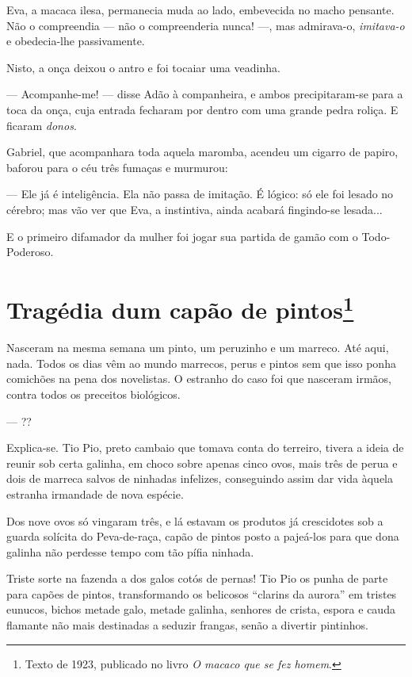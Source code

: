 Eva, a macaca ilesa, permanecia muda ao lado, embevecida no macho
pensante. Não o compreendia --- não o compreenderia nunca! ---, mas
admirava-o, \emph{imitava-o} e obedecia-lhe passivamente.

Nisto, a onça deixou o antro e foi tocaiar uma veadinha.

--- Acompanhe-me! --- disse Adão à companheira, e ambos precipitaram-se
para a toca da onça, cuja entrada fecharam por dentro com uma grande
pedra roliça. E ficaram \emph{donos}.

Gabriel, que acompanhara toda aquela maromba, acendeu um cigarro de
papiro, baforou para o céu três fumaças e murmurou:

--- Ele já é inteligência. Ela não passa de imitação. É lógico: só ele
foi lesado no cérebro; mas vão ver que Eva, a instintiva, ainda acabará
fingindo-se lesada...

E o primeiro difamador da mulher foi jogar sua partida de gamão com o
Todo-Poderoso.

\chapter{Tragédia dum capão de pintos\footnote[*]{Texto de 1923, publicado no livro \emph{O macaco que se fez homem}.}}

Nasceram na mesma semana um pinto, um peruzinho e um marreco. Até aqui,
nada. Todos os dias vêm ao mundo marrecos, perus e pintos sem que isso
ponha comichões na pena dos novelistas. O estranho do caso foi que
nasceram irmãos, contra todos os preceitos biológicos.

--- ??

Explica-se. Tio Pio, preto cambaio que tomava conta do terreiro, tivera
a ideia de reunir sob certa galinha, em choco sobre apenas cinco ovos,
mais três de perua e dois de marreca salvos de ninhadas infelizes,
conseguindo assim dar vida àquela estranha irmandade de nova espécie.

Dos nove ovos só vingaram três, e lá estavam os produtos já crescidotes
sob a guarda solícita do Peva-de-raça, capão de pintos posto a pajeá-los
para que dona galinha não perdesse tempo com tão pífia ninhada.

Triste sorte na fazenda a dos galos cotós de pernas! Tio Pio os punha de
parte para capões de pintos, transformando os belicosos ``clarins da
aurora'' em tristes eunucos, bichos metade galo, metade galinha,
senhores de crista, espora e cauda flamante não mais destinadas a
seduzir frangas, senão a divertir pintinhos.


